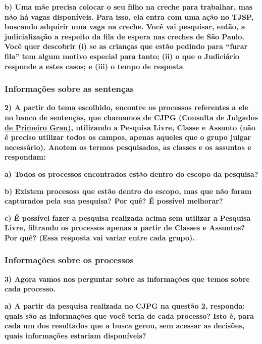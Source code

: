 \documentclass[
  letterpaper,
  DIV=11,
  numbers=noendperiod]{scrartcl}
\begin{document}
\textbf{b) Uma mãe precisa colocar o seu filho na creche para trabalhar,
mas não há vagas disponíveis. Para isso, ela entra com uma ação no TJSP,
buscando adquirir uma vaga na creche. Você vai pesquisar, então, a
judicialização a respeito da fila de espera nas creches de São Paulo.
Você quer descobrir (i) se as crianças que estão pedindo para ``furar
fila'' tem algum motivo especial para tanto; (ii) o que o Judiciário
responde a estes casos; e (iii) o tempo de resposta}

\hypertarget{informauxe7uxf5es-sobre-as-sentenuxe7as}{%
\subsubsection{Informações sobre as
sentenças}\label{informauxe7uxf5es-sobre-as-sentenuxe7as}}

\textbf{2) A partir do tema escolhido, encontre os processos referentes
a ele \href{https://esaj.tjsp.jus.br/cjpg/}{no banco de sentenças, que
chamamos de CJPG (Consulta de Julgados de Primeiro Grau)}, utilizando a
Pesquisa Livre, Classe e Assunto (não é preciso utilizar todos os
campos, apenas aqueles que o grupo julgar necessário). Anotem os termos
pesquisados, as classes e os assuntos e respondam:}

\textbf{a) Todos os processos encontrados estão dentro do escopo da
pesquisa?}

\textbf{b) Existem procesoss que estão dentro do escopo, mas que não
foram capturados pela sua pesquisa? Por quê? É possível melhorar?}

\textbf{c) É possível fazer a pesquisa realizada acima sem utilizar a
Pesquisa Livre, filtrando os processos apenas a partir de Classes e
Assuntos? Por quê? (Essa resposta vai variar entre cada grupo).}

\hypertarget{informauxe7uxf5es-sobre-os-processos}{%
\subsubsection{Informações sobre os
processos}\label{informauxe7uxf5es-sobre-os-processos}}

\textbf{3) Agora vamos nos perguntar sobre as informações que temos
sobre cada processo.}

\textbf{a) A partir da pesquisa realizada no CJPG na questão 2,
responda: quais são as informações que você teria de cada processo? Isto
é, para cada um dos resultados que a busca gerou, sem acessar as
decisões, quais informações estariam disponíveis?}
\end{document}
